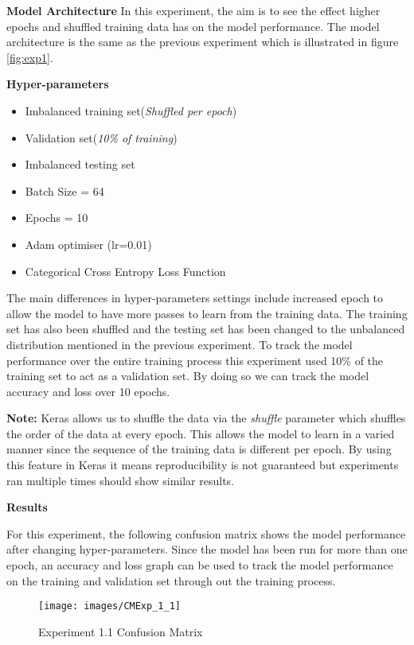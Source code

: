 \textbf{Model Architecture}
In this experiment, the aim is to see the effect higher epochs and shuffled training data has on the model performance.
The model architecture is the same as the previous experiment which is illustrated in figure \ref{fig:exp1}. 

\textbf{Hyper-parameters}

\begin{itemize}
	
	\item Imbalanced training set(\textit{Shuffled per epoch})
	\item Validation set(\textit{10\% of training})
	\item Imbalanced testing set 
	\item Batch Size = 64
	\item Epochs = 10
	\item Adam optimiser (lr=0.01) 
	\item Categorical Cross Entropy Loss Function
	
\end{itemize}

The main differences in hyper-parameters settings include increased epoch to allow the model to have more passes to learn from the training data. The training set has also been shuffled and the testing set has been changed to the unbalanced distribution mentioned in the previous experiment. To track the model performance over the entire training process this experiment used 10\% of the training set to act as a validation set. By doing so we can track the model accuracy and loss over 10 epochs. 

\textbf{Note:} Keras allows us to shuffle the data via the \textit{shuffle} parameter which shuffles the order of the data at every epoch. This allows the model to learn in a varied manner since the sequence of the training data is different per epoch. By using this feature in Keras it means reproducibility is not guaranteed but experiments ran multiple times should show similar results. 

\textbf{Results}

For this experiment, the following confusion matrix shows the model performance after changing hyper-parameters. Since the model has been run for more than one epoch, an accuracy and loss graph can be used to track the model performance on the training and validation set through out the training process.

\begin{figure}[H]
	\centering
	\hspace{-1cm}
	\texttt{[image: images/CMExp\_1\_1]}
	\caption{Experiment 1.1 Confusion Matrix}
	\label{fig:exp1.1_conf}
\end{figure}




